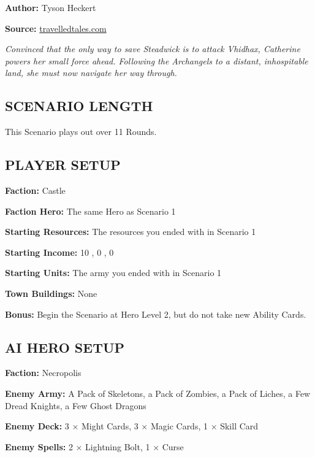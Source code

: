 
\begin{multicols}{2}

\textbf{Author:} Tyson Heckert

\textbf{Source:} \href{https://travelledtales.com}{travelledtales.com}

\textit{Convinced that the only way to save Steadwick is to attack Vhidhax, Catherine powers her small force ahead.
Following the Archangels to a distant, inhospitable land, she must now navigate her way through.}

\subsection*{\MakeUppercase{Scenario length}}

This Scenario plays out over 11 Rounds.

\subsection*{\MakeUppercase{Player setup}}

\textbf{Faction:} Castle

\textbf{Faction Hero:} The same Hero as Scenario 1

\textbf{Starting Resources:} The resources you ended with in Scenario 1

\textbf{Starting Income:} 10 , 0 , 0 

\textbf{Starting Units:} The army you ended with in Scenario 1

\textbf{Town Buildings:} None

\textbf{Bonus:} Begin the Scenario at Hero Level 2, but do not take new Ability Cards.

\subsection*{\MakeUppercase{AI Hero setup}}

\textbf{Faction:} Necropolis

\textbf{Enemy Army:} A Pack of Skeletons, a Pack of Zombies, a Pack of Liches, a Few Dread Knights, a Few Ghost Dragons

\textbf{Enemy Deck:} 3 × Might Cards, 3 × Magic Cards, 1 × Skill Card

\textbf{Enemy Spells:} 2 × Lightning Bolt, 1 × Curse


\end{multicols}

